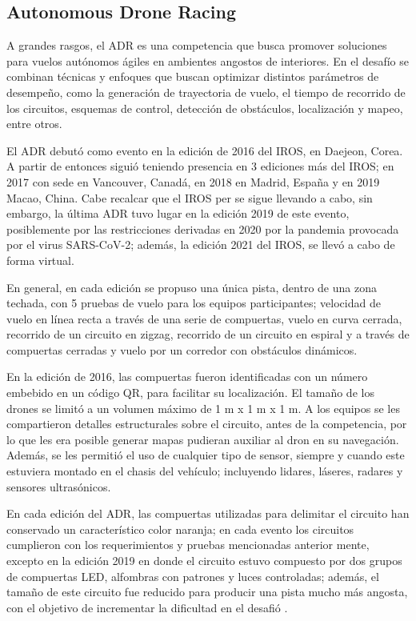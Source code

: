 \subsection{Autonomous Drone Racing}
A grandes rasgos, el ADR es una competencia que busca promover soluciones para vuelos autónomos ágiles en ambientes angostos de interiores. En el desafío se combinan técnicas y enfoques que buscan optimizar distintos parámetros de desempeño, como la generación de trayectoria de vuelo, el tiempo de recorrido de los circuitos, esquemas de control, detección de obstáculos, localización y mapeo, entre otros. 

El ADR debutó como evento en la edición de 2016 del IROS, en Daejeon, Corea. A partir de entonces siguió teniendo presencia en 3 ediciones más del IROS; en 2017 con sede en Vancouver, Canadá, en 2018 en Madrid, España y en 2019 Macao, China. Cabe recalcar que el IROS per se sigue llevando a cabo, sin embargo, la última ADR tuvo lugar en la edición 2019 de este evento, posiblemente por las restricciones derivadas en 2020 por la pandemia provocada por el virus SARS-CoV-2; además, la edición 2021 del IROS, se llevó a cabo de forma virtual.  

En general, en cada edición se propuso una única pista, dentro de una zona techada, con 5 pruebas de vuelo para los equipos participantes; velocidad de vuelo en línea recta a través de una serie de compuertas, vuelo en curva cerrada, recorrido de un circuito en zigzag, recorrido de un circuito en espiral y a través de compuertas cerradas y vuelo por un corredor con obstáculos dinámicos. 

En la edición de 2016, las compuertas fueron identificadas con un número embebido en un código QR, para facilitar su localización. El tamaño de los drones se limitó a un volumen máximo de  1 m x 1 m x 1 m. A los equipos se les compartieron detalles estructurales sobre el circuito, antes de la competencia, por lo que les era posible generar mapas pudieran auxiliar al dron en su navegación. Además, se les permitió el uso de cualquier tipo de sensor, siempre y cuando este estuviera montado en el chasis del vehículo; incluyendo lidares, láseres, radares y sensores ultrasónicos.

En cada edición del ADR, las compuertas utilizadas para delimitar el circuito han conservado un característico color naranja; en cada evento los circuitos cumplieron con los requerimientos y pruebas mencionadas anterior mente, excepto en la edición 2019 en donde el circuito estuvo compuesto por dos grupos de compuertas LED, alfombras con patrones y luces controladas; además, el tamaño de este circuito fue reducido para producir una pista mucho más angosta, con el objetivo de incrementar la dificultad en el desafió \cite{rojas2021board}.   

